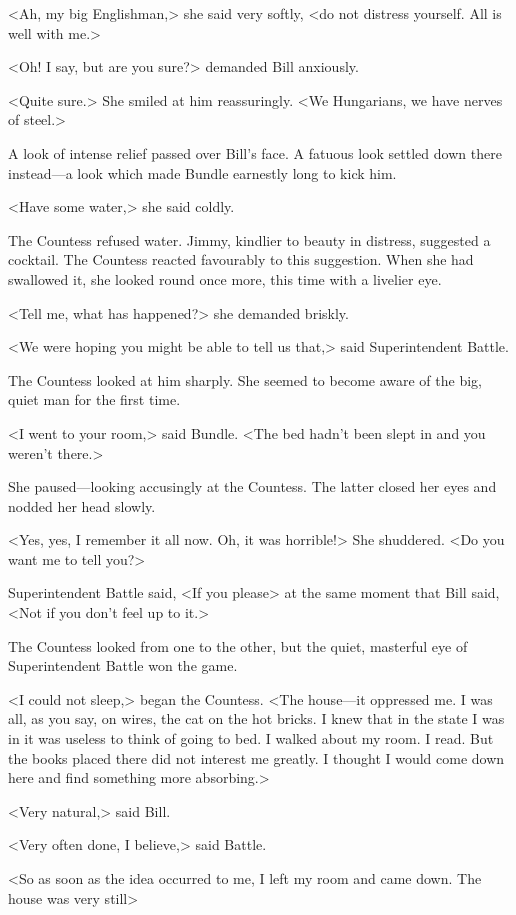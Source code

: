 <Ah, my big Englishman,> she said very softly, <do not distress yourself. All is well with me.>

<Oh! I say, but are you sure?> demanded Bill anxiously.

<Quite sure.> She smiled at him reassuringly. <We Hungarians, we have nerves of steel.>

A look of intense relief passed over Bill's face. A fatuous look settled down there instead—a look which made Bundle earnestly long to kick him.

<Have some water,> she said coldly.

The Countess refused water. Jimmy, kindlier to beauty in distress, suggested a cocktail. The Countess reacted favourably to this suggestion. When she had swallowed it, she looked round once more, this time with a livelier eye.

<Tell me, what has happened?> she demanded briskly.

<We were hoping you might be able to tell us that,> said Superintendent Battle.

The Countess looked at him sharply. She seemed to become aware of the big, quiet man for the first time.

<I went to your room,> said Bundle. <The bed hadn't been slept in and you weren't there.>

She paused—looking accusingly at the Countess. The latter closed her eyes and nodded her head slowly.

<Yes, yes, I remember it all now. Oh, it was horrible!> She shuddered. <Do you want me to tell you?>

Superintendent Battle said, <If you please> at the same moment that Bill said, <Not if you don't feel up to it.>

The Countess looked from one to the other, but the quiet, masterful eye of Superintendent Battle won the game.

<I could not sleep,> began the Countess. <The house—it oppressed me. I was all, as you say, on wires, the cat on the hot bricks. I knew that in the state I was in it was useless to think of going to bed. I walked about my room. I read. But the books placed there did not interest me greatly. I thought I would come down here and find something more absorbing.>

<Very natural,> said Bill.

<Very often done, I believe,> said Battle.

<So as soon as the idea occurred to me, I left my room and came down. The house was very still\longdash>

